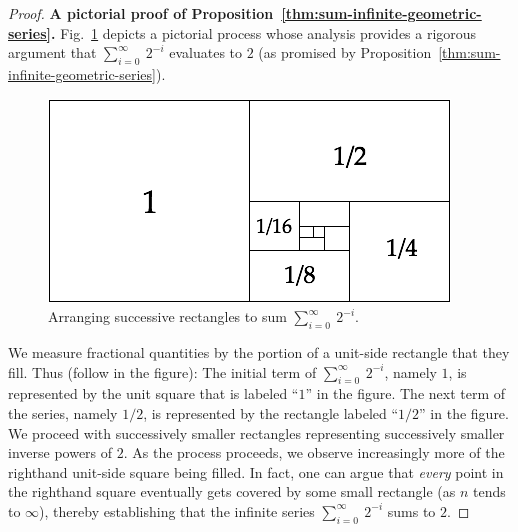\begin{proof}
{\bf A pictorial proof of Proposition~\ref{thm:sum-infinite-geometric-series}.}
%
Fig.~\ref{fig:sumGeoBasis} depicts a pictorial process whose analysis
provides a rigorous argument that $\displaystyle \sum_{i=0}^\infty
\ 2^{-i}$ evaluates to $2$ (as promised by
Proposition~\ref{thm:sum-infinite-geometric-series}).
\begin{figure}[h]
\begin{center}
       \includegraphics[scale=0.4]{FiguresMaths/SumGeometric1sur2Bis}
 \caption{Arranging successive rectangles to sum $\displaystyle
   \sum_{i=0}^\infty \ 2^{-i}$.}
       \label{fig:sumGeoBasis}
\end{center}
\end{figure}
We measure fractional quantities by the portion of a unit-side
rectangle that they fill.  Thus (follow in the figure): The initial
term of $\displaystyle \sum_{i=0}^\infty \ 2^{-i}$, namely $1$, is
represented by the unit square that is labeled ``$1$'' in the figure.
The next term of the series, namely $1/2$, is represented by the
rectangle labeled ``$1/2$'' in the figure.  We proceed with
successively smaller rectangles representing successively smaller
inverse powers of $2$.  As the process proceeds, we observe
increasingly more of the righthand unit-side square being filled.  In
fact, one can argue that {\em every} point in the righthand square
eventually gets covered by some small rectangle (as $n$ tends to
$\infty$), thereby establishing that the infinite series
$\displaystyle \sum_{i=0}^\infty \ 2^{-i}$ sums to $2$.



\end{proof}
